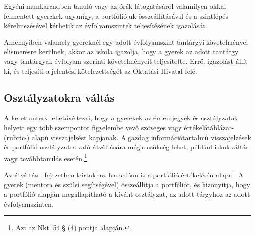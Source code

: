 Egyéni munkarendben tanuló vagy az órák látogatásáról valamilyen okkal felmentett gyerekek ugyanígy, a portfóliójuk összeállításával és a szintlépés kérelmezésével kérhetik az évfolyamszintek teljesítésének igazolását.

Amennyiben valamely gyereknél egy adott évfolyamszint tantárgyi követelményei elismerésre kerülnek, akkor az iskola igazolja, hogy a gyerek az adott tantárgy vagy tantárgyak évfolyam szerinti követelményeit teljesítette. Erről igazolást állít ki, és teljesíti a jelentési kötelezettségét az Oktatási Hivatal felé.

\subsection{Osztályzatokra váltás}
\label{sec:osztalyzatok}
A kerettanterv lehetővé teszi, hogy a gyerekek az érdemjegyek és osztályzatok helyett egy több szempontot figyelembe vevő szöveges vagy értékelőtáblázat- (rubric-) alapú visszajelzést kapjanak. A gazdag információtartalmú visszajelzések és portfólió osztályzatra való átváltására mégis szükség lehet, például iskolaváltás vagy továbbtanulás esetén.\footnote{Azt az Nkt. 54.§ (4) pontja alapján.}

Az átváltás . fejezetben leírtakhoz hasonlóan is a portfólió értékelésén alapul. A gyerek (mentora és szülei segítségével) összeállítja a portfóliót, és bizonyítja, hogy a portfólió alapján megállapítható a kívánt osztályzat, az adott tárgyhoz az adott évfolyamszinten.
